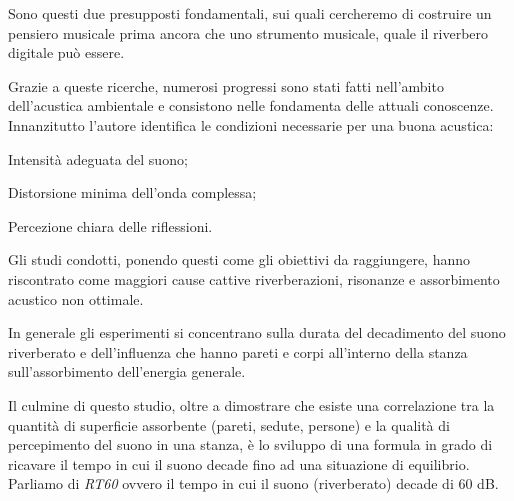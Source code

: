 Sono questi due presupposti fondamentali, sui quali cercheremo di costruire un
pensiero musicale prima ancora che uno strumento musicale, quale il riverbero
digitale può essere.

\bigskip





Grazie a queste ricerche, numerosi progressi sono stati fatti nell’ambito dell’acustica ambientale e consistono nelle fondamenta delle attuali conoscenze.
Innanzitutto l’autore identifica le condizioni necessarie per una buona acustica:
\begin{compactitem}
\item Intensità adeguata del suono;
\item Distorsione minima dell’onda complessa;
\item Percezione chiara delle riflessioni.
\end{compactitem}

Gli studi condotti, ponendo questi come gli obiettivi da raggiungere, hanno riscontrato come maggiori cause cattive riverberazioni, risonanze e assorbimento acustico non ottimale.

In generale gli esperimenti si concentrano sulla durata del decadimento del suono riverberato e dell’influenza che hanno pareti e corpi all’interno della stanza sull’assorbimento dell’energia generale.

Il culmine di questo studio, oltre a dimostrare che esiste una correlazione tra la quantità di superficie assorbente (pareti, sedute, persone) e la qualità di percepimento del suono in una stanza, è lo sviluppo di una formula in grado di ricavare il tempo in cui il suono decade fino ad una situazione di equilibrio.
Parliamo di \emph{RT60} ovvero il tempo in cui il suono (riverberato) decade di 60 dB.

